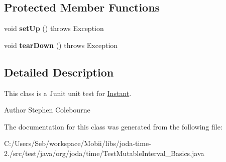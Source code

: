 \subsection*{Protected Member Functions}
\begin{DoxyCompactItemize}
\item 
\hypertarget{classorg_1_1joda_1_1time_1_1_test_mutable_interval___basics_ab412e29a8c96e9643de5e9e4ce543276}{void {\bfseries set\-Up} ()  throws Exception }\label{classorg_1_1joda_1_1time_1_1_test_mutable_interval___basics_ab412e29a8c96e9643de5e9e4ce543276}

\item 
\hypertarget{classorg_1_1joda_1_1time_1_1_test_mutable_interval___basics_ab23c8035634290ba58742e85c2258ae8}{void {\bfseries tear\-Down} ()  throws Exception }\label{classorg_1_1joda_1_1time_1_1_test_mutable_interval___basics_ab23c8035634290ba58742e85c2258ae8}

\end{DoxyCompactItemize}


\subsection{Detailed Description}
This class is a Junit unit test for \hyperlink{classorg_1_1joda_1_1time_1_1_instant}{Instant}.

\begin{DoxyAuthor}{Author}
Stephen Colebourne 
\end{DoxyAuthor}


The documentation for this class was generated from the following file\-:\begin{DoxyCompactItemize}
\item 
C\-:/\-Users/\-Seb/workspace/\-Mobii/libs/joda-\/time-\/2./src/test/java/org/joda/time/Test\-Mutable\-Interval\-\_\-\-Basics.\-java\end{DoxyCompactItemize}
